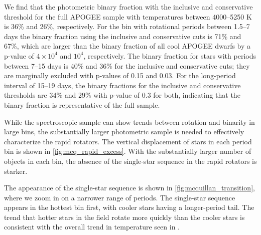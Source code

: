 \documentclass[manuscript]{aastex6}
\begin{document}
We find that the photometric binary fraction with the inclusive and conservative 
threshold for the full APOGEE sample with temperatures between 4000--5250 K is 
36\% and 26\%, respectively. For the bin with rotational periods between 
1.5--7 days the binary fraction using the inclusive and conservative cuts is
71\% and 67\%, which are larger than the binary fraction of all cool APOGEE 
dwarfs by a p-value of \(4 \times 10^4\) and \(10^4\), respectively. The binary 
fraction for stars with periods between 7--15 days is 40\% and 36\% for the
inclusive and conservative cuts; they are marginally excluded with p-values
of 0.15 and 0.03. For the long-period interval of 15--19 days, the binary 
fractions for the inclusive and conservative thresholds are 34\% and 29\% with 
p-value of 0.3 for both, indicating that the binary fraction is representative 
of the full sample.

\begin{figure*}[htb]
    \centering
    \caption{\emph{Top Left to Bottom Right:} Vertical displacement of all 
        cool \citet{McQuillan14} targets in period bins \(> 15\) days, 
        \(7--15\) days, \(1.5--7\) days, and less than 1.5 days. Pink stars 
        denote eclipsing binaries with orbital periods within the same ranges. 
        The green and purple lines denote the inclusive and conservative 
        photometric binary thresholds, 
    respectively}\label{fig:mcq_rapid_excess}
\end{figure*}

While the spectroscopic sample can show trends between rotation and binarity in
large bins, the substantially larger photometric sample is needed to 
effectively characterize the rapid rotators. The vertical displacement of stars 
in each period bin is shown in \cref{fig:mcq_rapid_excess}. With the 
substantially larger number of objects in each bin, the absence of the
single-star sequence in the rapid rotators is starker.

\begin{figure*}[htb]
    \centering
    \caption{Same as \cref{fig:mcq_rapid_excess} except with the period ranges
    7--9 days, 9--11 days, 11--13 days, and 13--15 days.}
    \label{fig:mcquillan_transition}
\end{figure*}

The appearance of the single-star sequence is shown in
\cref{fig:mcquillan_transition}, where we zoom in on a narrower range of
periods. The single-star sequence appears in the
hottest bin first, with cooler stars having a longer-period tail. The trend
that hotter stars in the field rotate more quickly than the cooler stars 
is consistent with the overall trend in temperature seen in 
\citet{McQuillan14}.
\end{document}
